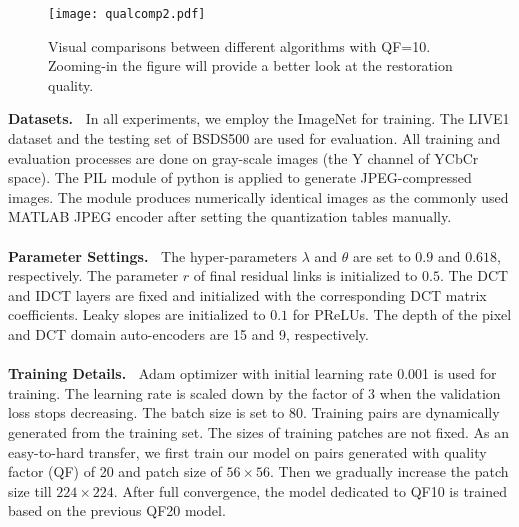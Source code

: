 \documentclass{article}
\begin{document}
\begin{figure*}[htb]
  \vspace{-0.5cm}
  \begin{minipage}[b]{1.0\linewidth}
    \centering
    \centerline{\texttt{[image: qualcomp2.pdf]}}
\caption{Visual comparisons between different algorithms with QF=10.
    Zooming-in the figure will provide a better look at the restoration quality.}\medskip
    \label{fig:f3}
    \vspace{-0.7cm}
  \end{minipage}
\end{figure*}

\textbf{Datasets.\ }
In all experiments, we employ the ImageNet \cite{ILSVRC15} for training.
The LIVE1 dataset and the testing set of BSDS500 are used for evaluation.
All training and evaluation processes are done on gray-scale images
(the Y channel of YCbCr space). The PIL module of python is applied to
generate JPEG-compressed images. The module produces numerically identical images
as the commonly used MATLAB JPEG encoder after setting the quantization tables manually.
\vspace{-0.1cm}
\\\\
\textbf{Parameter Settings.\ }
The hyper-parameters $\lambda$ and $\theta$ are set to $0.9$ and $0.618$,
respectively. The parameter $r$ of final residual links is initialized
to $0.5$. The DCT and IDCT layers are fixed and initialized with the
corresponding DCT matrix coefficients. Leaky slopes are initialized
to $0.1$ for PReLUs. The depth of the pixel and DCT domain auto-encoders
are 15 and 9, respectively.
\vspace{-0.1cm}
\\\\
\textbf{Training Details.\ }
Adam optimizer with initial learning rate 0.001 is used for training.
The learning rate is scaled down by the factor of 3 when
the validation loss stops decreasing. The batch size is set to 80.
Training pairs are dynamically generated from the training set. The sizes of
training patches are not fixed. As an easy-to-hard transfer, we first train
our model on pairs generated with quality factor (QF) of 20 and patch size
of $56 \times 56$. Then we gradually increase the patch size
till $224 \times 224$. After full convergence, the model
dedicated to QF10 is trained based on the previous QF20 model.  \\\\
\vspace{-1.1cm}
\end{document}
